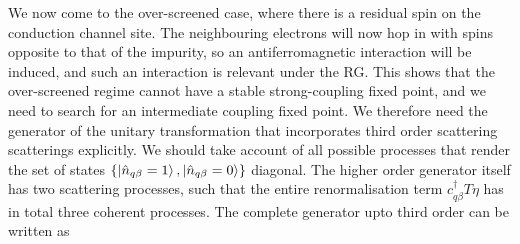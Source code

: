 \documentclass[reprint,prb,superscriptaddress]{revtex4-2}
\begin{document}
We now come to the over-screened case, where there is a residual spin on the conduction channel site. The neighbouring electrons will now hop in with spins opposite to that of the impurity, so an antiferromagnetic interaction will be induced, and such an interaction is relevant under the RG. This shows that the over-screened regime cannot have a stable strong-coupling fixed point, and we need to search for an intermediate coupling fixed point. We therefore need the generator of the unitary transformation that incorporates third order scattering scatterings explicitly. We should take account of all possible processes that render the set of states \(\left\{\ket{\hat n_{q\beta}=1},\ket{\hat n_{q\beta}=0}\right\}\) diagonal. The higher order generator itself has two scattering processes, such that the entire renormalisation term \(c^\dagger_{q\beta} T \eta\) has in total three coherent processes. The complete generator upto third order can be written as
\end{document}
